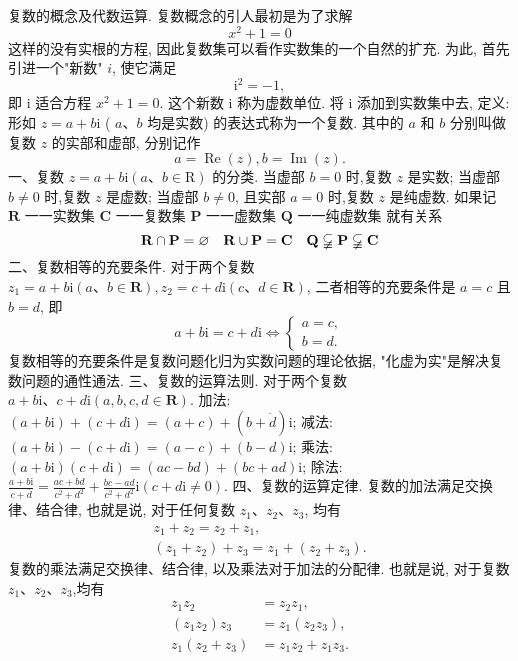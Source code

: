 
复数的概念及代数运算.
复数概念的引人最初是为了求解
$$
x^2+1=0
$$
这样的没有实根的方程, 因此复数集可以看作实数集的一个自然的扩充.
为此, 首先引进一个"新数" $i$, 使它满足
$$
\mathrm{i}^2=-1,
$$
即 $\mathrm{i}$ 适合方程 $x^2+1=0$. 这个新数 $\mathrm{i}$ 称为虚数单位.
将 $\mathrm{i}$ 添加到实数集中去, 定义:形如 $z=a+b \mathrm{i}$ ( $a 、 b$ 均是实数) 的表达式称为一个复数.
其中的 $a$ 和 $b$ 分别叫做复数 $z$ 的实部和虚部, 分别记作
$$
a=\operatorname{Re}(z), b=\operatorname{Im}(z) .
$$
一、复数 $z=a+b \mathrm{i}(a 、 b \in \mathrm{R})$ 的分类.
当虚部 $b=0$ 时,复数 $z$ 是实数;
当虚部 $b \neq 0$ 时,复数 $z$ 是虚数;
当虚部 $b \neq 0$, 且实部 $a=0$ 时,复数 $z$ 是纯虚数.
如果记
$\mathbf{R}$ 一一实数集
$\mathbf{C}$ 一一复数集
$\mathbf{P}$ 一一虚数集
$\mathbf{Q}$ 一一纯虚数集
就有关系
$$
\mathbf{R} \cap \mathbf{P}=\varnothing \quad \mathbf{R} \cup \mathbf{P}=\mathbf{C} \quad \mathbf{Q} \varsubsetneqq \mathbf{P} \varsubsetneqq \mathbf{C}
$$
二、复数相等的充要条件.
对于两个复数 $z_1=a+b \mathrm{i}(a 、 b \in \mathbf{R}), z_2=c+d \mathrm{i}(c 、 d \in \mathbf{R})$, 二者相等的充要条件是 $a=c$ 且 $b=d$, 即
$$
a+b \mathrm{i}=c+d \mathrm{i} \Leftrightarrow\left\{\begin{array}{l}
a=c, \\
b=d .
\end{array}\right.
$$
复数相等的充要条件是复数问题化归为实数问题的理论依据, "化虚为实"是解决复数问题的通性通法.
三、复数的运算法则.
对于两个复数 $a+b \mathrm{i} 、 c+d \mathrm{i}(a, b, c, d \in \mathbf{R})$.
加法: $(a+b \mathrm{i})+(c+d \mathrm{i})=(a+c)+(b+\dot{d}) \mathrm{i}$;
减法: $(a+b \mathrm{i})-(c+d \mathrm{i})=(a-c)+(b-d) \mathrm{i}$;
乘法: $(a+b \mathrm{i})(c+d \mathrm{i})=(a c-b d)+(b c+a d) \mathrm{i}$;
除法: $\frac{a+b \mathrm{i}}{c+\bar{d}}=\frac{a c+b d}{c^2+d^2}+\frac{b c-a d}{c^2+d^2} \mathrm{i}(c+d \mathrm{i} \neq 0)$.
四、复数的运算定律.
复数的加法满足交换律、结合律, 也就是说, 对于任何复数 $z_1 、 z_2 、 z_3$, 均有
$$
\begin{gathered}
z_1+z_2=z_2+z_1, \\
\left(z_1+z_2\right)+z_3=z_1+\left(z_2+z_3\right) .
\end{gathered}
$$
复数的乘法满足交换律、结合律, 以及乘法对于加法的分配律.
也就是说, 对于复数 $z_1 、 z_2 、 z_3$,均有
$$
\begin{aligned}
z_1 z_2 & =z_2 z_1, \\
\left(z_1 z_2\right) z_3 & =z_1\left(z_2 z_3\right), \\
z_1\left(z_2+z_3\right) & =z_1 z_2+z_1 z_3 .
\end{aligned}
$$

